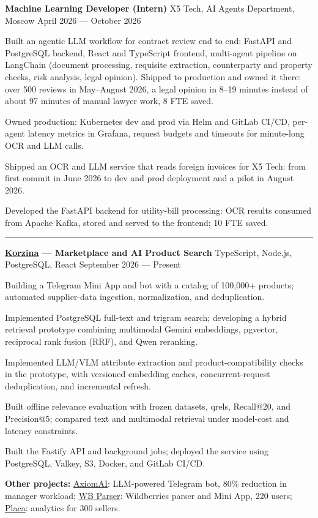 \documentclass[10pt,a4paper]{article}
\newcommand{\cvsection}[1]{%
  \vspace{5pt}{\large\bfseries #1}\par\vspace{2pt}\hrule\vspace{3pt}}
\newcommand{\cventry}[3]{%
  \textbf{#1} \textbar{} #3 \textbar{} #2\par\vspace{1pt}}
\begin{document}
\cventry{Machine Learning Developer (Intern)}{April 2026 --- October 2026}{X5 Tech, AI Agents Department, Moscow}
\begin{cvitems}
    \item Built an agentic LLM workflow for contract review end to end: FastAPI and PostgreSQL backend, React and TypeScript frontend, multi-agent pipeline on LangChain (document processing, requisite extraction, counterparty and property checks, risk analysis, legal opinion). Shipped to production and owned it there: over 500 reviews in May--August 2026, a legal opinion in 8--19 minutes instead of about 97 minutes of manual lawyer work, 8 FTE saved.
    \item Owned production: Kubernetes dev and prod via Helm and GitLab CI/CD, per-agent latency metrics in Grafana, request budgets and timeouts for minute-long OCR and LLM calls.
    \item Shipped an OCR and LLM service that reads foreign invoices for X5 Tech: from first commit in June 2026 to dev and prod deployment and a pilot in August 2026.
    \item Developed the FastAPI backend for utility-bill processing: OCR results consumed from Apache Kafka, stored and served to the frontend; 10 FTE saved.
\end{cvitems}

\cvsection{Projects}
\cventry{\href{https://github.com/noobmaster-ru/korzina-market}{Korzina} --- Marketplace and AI Product Search}{September 2026 --- Present}{TypeScript, Node.js, PostgreSQL, React}
\begin{cvitems}
    \item Building a Telegram Mini App and bot with a catalog of 100,000+ products; automated supplier-data ingestion, normalization, and deduplication.
    \item Implemented PostgreSQL full-text and trigram search; developing a hybrid retrieval prototype combining multimodal Gemini embeddings, pgvector, reciprocal rank fusion (RRF), and Qwen reranking.
    \item Implemented LLM/VLM attribute extraction and product-compatibility checks in the prototype, with versioned embedding caches, concurrent-request deduplication, and incremental refresh.
    \item Built offline relevance evaluation with frozen datasets, qrels, Recall@20, and Precision@5; compared text and multimodal retrieval under model-cost and latency constraints.
    \item Built the Fastify API and background jobs; deployed the service using PostgreSQL, Valkey, S3, Docker, and GitLab CI/CD.
\end{cvitems}
\textbf{Other projects:} \href{https://github.com/noobmaster-ru/axiomai}{AxiomAI}: LLM-powered Telegram bot, 80\% reduction in manager workload; \href{https://github.com/noobmaster-ru/tg-mini-app-backend}{WB Parser}: Wildberries parser and Mini App, 220 users; \href{https://github.com/noobmaster-ru/wb_tables}{Placa}: analytics for 300 sellers.\par
\end{document}
